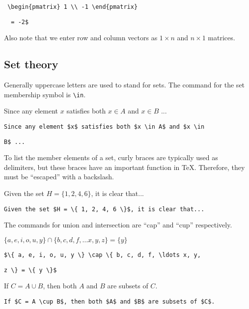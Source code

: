 \verb" \begin{pmatrix} 1 \\ -1 \end{pmatrix} "

\verb"  = -2$"

\bigskip

Also note that we enter row and column vectors as $1 \times n$ and $n \times 1$ matrices.

\subsection{Set theory}

Generally uppercase letters are used to stand for sets. The command for the set membership symbol is \verb=\in=.

\medskip

Since any element $x$ satisfies both $x \in A$ and $x \in B$ ...

\smallskip

\verb'Since any element $x$ satisfies both $x \in A$ and $x \in'

\verb'B$ ...'

\bigskip

To list the member elements of a set, curly braces are typically used as delimiters, but these braces have an important function in \TeX. Therefore, they must be ``escaped'' with a backslash.

\medskip

Given the set $H = \{ 1, 2, 4, 6 \}$, it is clear that...

\smallskip

\verb'Given the set $H = \{ 1, 2, 4, 6 \}$, it is clear that...'

\bigskip

The commands for union and intersection are ``cap'' and ``cup'' respectively.

\medskip

$\{ a, e, i, o, u, y \} \cap \{ b, c, d, f, \ldots x, y, z \} = \{ y \}$

\smallskip

\verb'$\{ a, e, i, o, u, y \} \cap \{ b, c, d, f, \ldots x, y,'

\verb'z \} = \{ y \}$'

\medskip

If $C = A \cup B$, then both $A$ and $B$ are subsets of $C$.

\smallskip

\verb'If $C = A \cup B$, then both $A$ and $B$ are subsets of $C$.'

